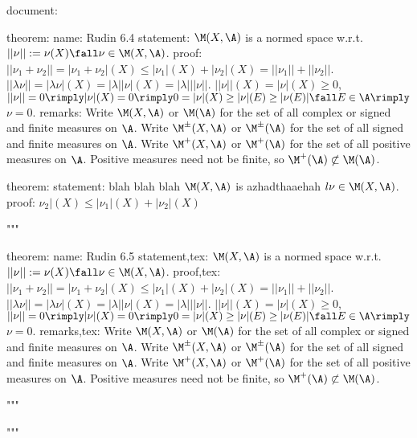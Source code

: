 

document:

    theorem:
        name:
            Rudin 6.4
        statement:
            $\M(X, \A)$ is a normed space w.r.t. $||\nu|| := \nu(X) \fall \nu \in \M(X, \A)$.
        proof:
            $|| \nu_1 + \nu_2 || = |\nu_1 + \nu_2|(X) \le |\nu_1|(X) + |\nu_2|(X) = ||\nu_1|| + ||\nu_2|| $. $||\lambda \nu|| = |\lambda \nu|(X) = |\lambda| |\nu|(X) = |\lambda| ||\nu||$. $||\nu||(X) = |\nu|(X) \ge 0$, $||\nu|| = 0 \rimply |\nu|(X) = 0 \rimply 0 = |\nu|(X) \ge |\nu|(E) \ge |\nu(E)| \fall E \in \A \rimply$ $\nu = 0$.
        remarks:
            Write $\M(X,\A)$ or $\M(\A)$ for the set of all complex or signed and finite measures on $\A$.
            Write $\M^\pm(X,\A)$ or $\M^\pm(\A)$ for the set of all signed and finite measures on $\A$.
            Write $\M^+(X,\A)$ or $\M^+(\A)$ for the set of all positive measures on $\A$. 
            Positive measures need not be finite, so $\M^+(\A) \not \subset \M(\A)$.


    theorem:
        statement:
            blah blah blah $\M(X, \A)$ is azhadthaaehah $l \nu \in \M(X, \A)$.
        proof:
            $\nu_2|(X) \le |\nu_1|(X) + |\nu_2|(X) $





"""


theorem:
    name:
        Rudin 6.5
    statement,tex:
        $\M(X, \A)$ is a normed space w.r.t. $||\nu|| := \nu(X) \fall \nu \in \M(X, \A)$.
    proof,tex:
        $|| \nu_1 + \nu_2 || = |\nu_1 + \nu_2|(X) \le |\nu_1|(X) + |\nu_2|(X) = ||\nu_1|| + ||\nu_2|| $. $||\lambda \nu|| = |\lambda \nu|(X) = |\lambda| |\nu|(X) = |\lambda| ||\nu||$. $||\nu||(X) = |\nu|(X) \ge 0$, $||\nu|| = 0 \rimply |\nu|(X) = 0 \rimply 0 = |\nu|(X) \ge |\nu|(E) \ge |\nu(E)| \fall E \in \A \rimply$ $\nu = 0$.
    remarks,tex:
        Write $\M(X,\A)$ or $\M(\A)$ for the set of all complex or signed and finite measures on $\A$.
        Write $\M^\pm(X,\A)$ or $\M^\pm(\A)$ for the set of all signed and finite measures on $\A$.
        Write $\M^+(X,\A)$ or $\M^+(\A)$ for the set of all positive measures on $\A$. 
        Positive measures need not be finite, so $\M^+(\A) \not \subset \M(\A)$.



"""







"""


